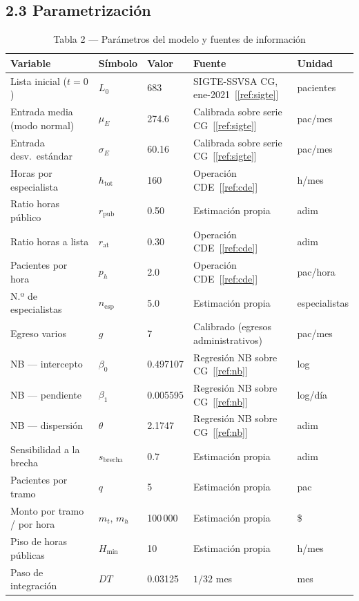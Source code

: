 \documentclass[12pt,a4paper]{article}
\begin{document}
\subsection*{2.3 Parametrización}

\begin{table}[H]
\centering
\caption{Tabla 2 — Parámetros del modelo y fuentes de información}
\label{tab:parametros}
\begin{tabularx}{\textwidth}{@{}p{4.6cm}p{2cm}p{1.7cm}Xp{2.1cm}@{}}
\toprule
\rowcolor{azulDS!15}
\textbf{Variable} & \textbf{Símbolo} & \textbf{Valor} & \textbf{Fuente} & \textbf{Unidad} \\
\midrule
Lista inicial ($t{=}0$) & $L_0$ & 683 &
  SIGTE-SSVSA CG, ene-2021~[\ref{ref:sigte}] & pacientes \\[3pt]
Entrada media (modo normal) & $\mu_E$ & 274.6 &
  Calibrada sobre serie CG~[\ref{ref:sigte}] & pac/mes \\[3pt]
Entrada desv.\ estándar & $\sigma_E$ & 60.16 &
  Calibrada sobre serie CG~[\ref{ref:sigte}] & pac/mes \\[3pt]
Horas por especialista & $h_{\text{tot}}$ & 160 &
  Operación CDE~[\ref{ref:cde}] & h/mes \\[3pt]
Ratio horas público & $r_{\text{pub}}$ & 0.50 &
  Estimación propia & adim \\[3pt]
Ratio horas a lista & $r_{\text{at}}$ & 0.30 &
  Operación CDE~[\ref{ref:cde}] & adim \\[3pt]
Pacientes por hora & $p_h$ & 2.0 &
  Operación CDE~[\ref{ref:cde}] & pac/hora \\[3pt]
N.º de especialistas & $n_{\text{esp}}$ & 5.0 &
  Estimación propia & especialistas \\[3pt]
Egreso varios & $g$ & 7 &
  Calibrado (egresos administrativos) & pac/mes \\[3pt]
NB — intercepto & $\beta_0$ & 0.497107 &
  Regresión NB sobre CG~[\ref{ref:nb}] & log \\[3pt]
NB — pendiente & $\beta_1$ & 0.005595 &
  Regresión NB sobre CG~[\ref{ref:nb}] & log/día \\[3pt]
NB — dispersión & $\theta$ & 2.1747 &
  Regresión NB sobre CG~[\ref{ref:nb}] & adim \\[3pt]
Sensibilidad a la brecha & $s_{\text{brecha}}$ & 0.7 &
  Estimación propia & adim \\[3pt]
Pacientes por tramo & $q$ & 5 &
  Estimación propia & pac \\[3pt]
Monto por tramo / por hora & $m_t,\,m_h$ & 100\,000 &
  Estimación propia & \$ \\[3pt]
Piso de horas públicas & $H_{\min}$ & 10 &
  Estimación propia & h/mes \\[3pt]
Paso de integración & $DT$ & 0.03125 &
  $1/32$ mes & mes \\
\bottomrule
\end{tabularx}
\end{table}
\end{document}
